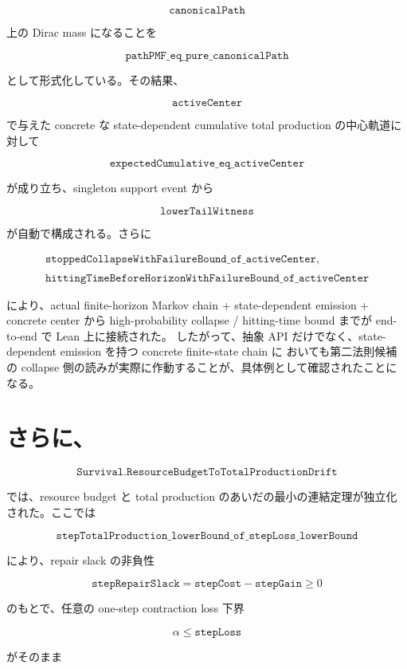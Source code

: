 \documentclass[12pt,a4paper]{article}
\begin{document}
\[
\texttt{canonicalPath}
\]

上の Dirac mass になることを

\[
\texttt{pathPMF\_eq\_pure\_canonicalPath}
\]

として形式化している。その結果、

\[
\texttt{activeCenter}
\]

で与えた concrete な state-dependent cumulative total production の中心軌道に対して

\[
\texttt{expectedCumulative\_eq\_activeCenter}
\]

が成り立ち、singleton support event から

\[
\texttt{lowerTailWitness}
\]

が自動で構成される。さらに

\[
\begin{aligned}
\texttt{stoppedCollapseWithFailureBound\_of\_activeCenter}, \\
\qquad \\
\texttt{hittingTimeBeforeHorizonWithFailureBound\_of\_activeCenter}
\end{aligned}
\]

により、actual finite-horizon Markov chain + state-dependent emission + concrete center から high-probability collapse / hitting-time bound までが end-to-end で Lean 上に接続された。 したがって、抽象 API だけでなく、state-dependent emission を持つ concrete finite-state chain に おいても第二法則候補の collapse 側の読みが実際に作動することが、具体例として確認されたことになる。

\section{さらに、}\label{ux3055ux3089ux306b-10}

\[
\texttt{Survival.ResourceBudgetToTotalProductionDrift}
\]

では、resource budget と total production のあいだの最小の連結定理が独立化された。ここでは

\[
\texttt{stepTotalProduction\_lowerBound\_of\_stepLoss\_lowerBound}
\]

により、repair slack の非負性

\[
\texttt{stepRepairSlack} = \texttt{stepCost} - \texttt{stepGain} \ge 0
\]

のもとで、任意の one-step contraction loss 下界

\[
\alpha \le \texttt{stepLoss}
\]

がそのまま
\end{document}
